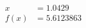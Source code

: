 \documentclass[preview]{standalone}
\begin{document}
\begin{align*}
x &= 1.0429\\f(x) &= 5.6123863
\end{align*}
\end{document}
